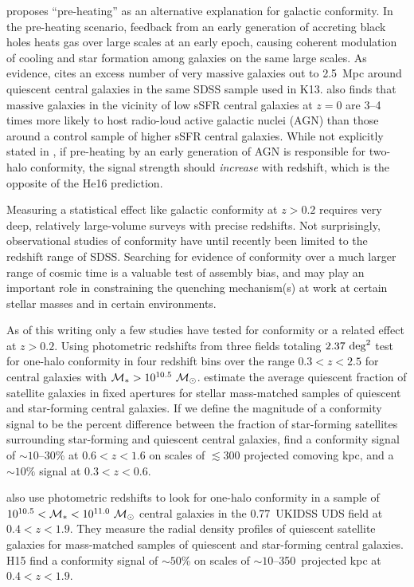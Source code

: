 \citet{Kauffmann15} proposes ``pre-heating'' as an alternative explanation for galactic conformity.
In the pre-heating scenario, feedback from an early generation of accreting black holes heats gas over large scales at an early epoch, causing coherent modulation of cooling and star formation among galaxies on the same large scales.
As evidence, \citet{Kauffmann15} cites an excess number of very massive galaxies out to 2.5~Mpc around quiescent central galaxies in the same SDSS sample used in K13.
\citet{Kauffmann15} also finds that massive galaxies in the vicinity of low sSFR central galaxies at $z=0$ are 3--4 times more likely to host radio-loud active galactic nuclei (AGN) than those around a control sample of higher sSFR central galaxies.
While not explicitly stated in \citet{Kauffmann15}, if pre-heating by an early generation of AGN is responsible for two-halo conformity, the signal strength should \emph{increase} with redshift, which is the opposite of the He16 prediction.

Measuring a statistical effect like galactic conformity at $z>0.2$ requires very deep, relatively large-volume surveys with precise redshifts.
Not surprisingly, observational studies of conformity have until recently been limited to the redshift range of SDSS.
Searching for evidence of conformity over a much larger range of cosmic time is a valuable test of assembly bias, and may play an important role in constraining the quenching mechanism(s) at work at certain stellar masses and in certain environments.

As of this writing only a few studies have tested for conformity or a related effect at $z>0.2$.
Using photometric redshifts from three fields totaling $2.37~\degsq$
\citet{Kawinwanichakij16} test for one-halo conformity in four redshift bins over the range ${0.3 < z < 2.5}$ for central galaxies with ${\mstar > 10^{10.5}~\msun}$.
\citet{Kawinwanichakij16} estimate the average quiescent fraction of satellite galaxies in fixed apertures for stellar mass-matched samples of quiescent and star-forming central galaxies.
If we define the magnitude of a conformity signal to be the percent difference between the fraction of star-forming satellites surrounding star-forming and quiescent central galaxies, \citet{Kawinwanichakij16}
find a conformity signal of $\sim10$--30\% at ${0.6 < z < 1.6}$ on scales of $\lesssim300$ projected comoving kpc, and
a $\sim10\%$ signal at ${0.3 < z < 0.6}$.

\citet[][hereafter H15]{Hartley15} also use photometric redshifts to look for one-halo conformity in a sample of ${10^{10.5}<\mstar<10^{11.0}~\msun}$ central galaxies in the 0.77~\degsq UKIDSS UDS field at ${0.4 < z < 1.9}$.
They measure the radial density profiles of quiescent satellite galaxies
for mass-matched samples of quiescent and star-forming central galaxies.
H15 find a conformity signal of $\sim50$\% on scales of $\sim10$--350~projected kpc at $0.4<z<1.9$.

